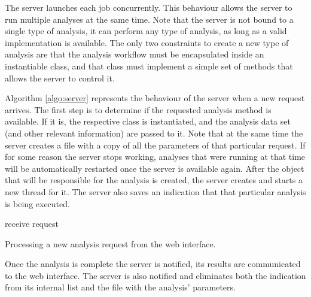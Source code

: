 The server launches each job concurrently. This behaviour allows the server to
run multiple analyses at the same time. Note that the server is not bound to a
single type of analysis, it can perform any type of analysis, as long as a valid
implementation is available. The only two constraints to create a new type of
analysis are that the analysis workflow must be encapsulated inside an
instantiable class, and that class must implement a simple set of methods that
allows the server to control it.

Algorithm \ref{algo:server} represents the behaviour of the server when a new
request arrives. The first step is to determine if the requested analysis method
is available. If it is, the respective class is instantiated, and the analysis
data set (and other relevant information) are passed to it. Note that at the
same time the server creates a file with a copy of all the parameters of that
particular request. If for some reason the server stops working, analyses that
were running at that time will be automatically restarted once the server is
available again. After the object that will be responsible for the analysis is
created, the server creates and starts a new thread for it. The server also
saves an indication that that particular analysis is being executed.

\begin{algorithm}
  \LinesNumbered

  receive request\;
  \BlankLine

  \caption[Processing a new analysis request from the web interface]{
    Processing a new analysis request from the web interface.
  }
  \label{algo:server}
\end{algorithm}

Once the analysis is complete the server is notified, its results are
communicated to the web interface. The server is also notified and eliminates
both the indication from its internal list and the file with the analysis'
parameters.


